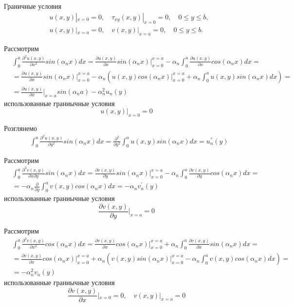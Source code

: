 Граничные условия
\begin{align*}
    &u(x,y) |_{x=0} = 0, \quad \tau_{xy}(x,y) |_{x=0} =0, \quad 0 \le y \le b, \\
    &u(x,y) |_{x=a} = 0, \quad v(x,y) |_{x=a} = 0, \quad 0 \le y \le b.
\end{align*}

Рассмотрим
\begin{align*}
    &\int_{0}^{a} \frac{\partial^2 u(x,y)}{\partial x^2} sin(\alpha_n x)dx = \frac{\partial u(x,y)}{\partial x} sin(\alpha_n x) |_{x=0}^{x=a} - \alpha_n \int_{0}^{a} \frac{\partial u(x,y)}{\partial x} cos(\alpha_n x)dx = \\
    &= \frac{\partial u(x,y)}{\partial x} sin(\alpha_n x) |_{x=0}^{x=a} - \alpha_n \left( u(x,y) cos(\alpha_n x) |_{x=0}^{x=a} + \alpha_n \int_{0}^{a} u(x,y) sin(\alpha_n x) dx \right) = \\
    &=\frac{\partial u(x,y)}{\partial x}|_{x=a} sin(\alpha_n a) -\alpha_n^2 u_n(y)
\end{align*}
использованные граниычные условия
\begin{equation*}
    u(x,y)|_{x=0} = 0
\end{equation*}

Розглянемо
\begin{align*}
    &\int_{0}^{a} \frac{\partial^2 u(x,y)}{\partial y^2} sin(\alpha_n x)dx = \frac{\partial^2}{\partial y^2} \int_{0}^{a} u(x,y) sin(\alpha_n x)dx = u_n^{''}(y)
\end{align*}

Рассмотрим
\begin{align*}
    &\int_{0}^{a} \frac{\partial^2 v(x,y)}{\partial x \partial y} sin(\alpha_n x) dx = \frac{\partial v(x,y)}{\partial y} sin(\alpha_n x) |_{x=0}^{x=a} - \alpha_n \int_{0}^{a} \frac{\partial v(x,y)}{\partial y} cos(\alpha_n x) dx = \\
    &= -\alpha_n \frac{\partial}{\partial y} \int_{0}^{a} v(x,y) cos(\alpha_n x) dx = -\alpha_n v_n^{'}(y)
\end{align*}
использованные граниычные условия
\begin{equation*}
    \frac{\partial v(x,y)}{\partial y}|_{x=a} = 0
\end{equation*}

Рассмотрим
\begin{align*}
    &\int_{0}^{a} \frac{\partial^2 v(x,y)}{\partial x^2} cos(\alpha_n x)dx = \frac{\partial v(x,y)}{\partial x} cos(\alpha_n x) |_{x=0}^{x=a} + \alpha_n \int_{0}^{a} \frac{\partial v(x,y)}{\partial x} sin(\alpha_n x) dx = \\
    &=\frac{\partial v(x,y)}{\partial x} cos(\alpha_n x) |_{x=0}^{x=a} + \alpha_n \left(v(x,y) sin(\alpha_n x)|_{x=0}^{x=a} - \alpha_n \int_{0}^{a} v(x,y) cos(\alpha_n x) dx  \right) = \\
    &= -\alpha_n^2 v_n(y)
\end{align*}
использованные граниычные условия
\begin{equation*}
    \frac{\partial v(x,y)}{\partial x}|_{x=0} = 0, \quad v(x, y)|_{x=a} = 0
\end{equation*}

